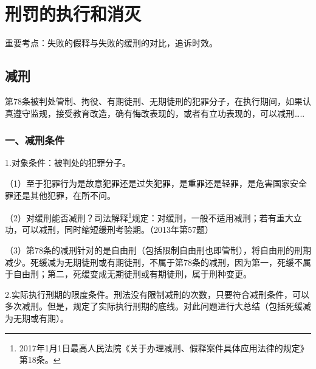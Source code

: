 \chapter{刑罚的执行和消灭}

\begin{EditionOpeningPanel}
重要考点：失败的假释与失败的缓刑的对比，追诉时效。
\end{EditionOpeningPanel}

\section{减刑}

第78条被判处管制、拘役、有期徒刑、无期徒刑的犯罪分子，在执行期间，如果认真遵守监规，接受教育改造，确有悔改表现的，或者有立功表现的，可以减刑…..

\subsection*{一、减刑条件}

1.对象条件：被判处的犯罪分子。

（1）至于犯罪行为是故意犯罪还是过失犯罪，是重罪还是轻罪，是危害国家安全罪还是其他犯罪，在所不问。

（2）对缓刑能否减刑？司法解释\footnote{2017年1月1日最高人民法院《关于办理减刑、假释案件具体应用法律的规定》第18条。}规定：对缓刑，一般不适用减刑；若有重大立功，可以减刑，同时缩短缓刑考验期。（2013年第57题）

（3）第78条的减刑针对的是自由刑（包括限制自由刑也即管制），将自由刑的刑期减少。死缓减为无期徒刑或有期徒刑，不属于第78条的减刑，因为第一，死缓不属于自由刑；第二，死缓变成无期徒刑或有期徒刑，属于刑种变更。

2.实际执行刑期的限度条件。刑法没有限制减刑的次数，只要符合减刑条件，可以多次减刑。但是，规定了实际执行刑期的底线。对此问题进行大总结（包括死缓减为无期或有期）。


